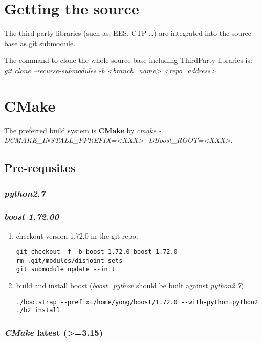 \documentclass[11pt]{article}
\author{Yong}
\date{\today}
\title{}
\begin{document}
\tableofcontents

\section{Getting the source}
\label{sec:org9200199}
The third party libraries (such as, EES, CTP \ldots{}) are integrated into the source base
as git submodule.

The command to clone the whole source base including ThirdParty libraries is:
\emph{git clone --recurse-submodules -b <branch\_name> <repo\_address>}

\section{CMake}
\label{sec:orge7b3446}
The preferred build system is \textbf{CMake} by \emph{cmake -DCMAKE\_INSTALL\_PPREFIX=<XXX> -DBoost\_ROOT=<XXX>}. 
\subsection{Pre-requsites}
\label{sec:org0c4a7f6}
\subsubsection{\emph{python2.7}}
\label{sec:org5d14f57}
\subsubsection{\emph{boost 1.72.00}}
\label{sec:org0d8594e}

\begin{enumerate}
\item checkout version 1.72.0 in the git repo:
\begin{verbatim}
git checkout -f -b boost-1.72.0 boost-1.72.0
rm .git/modules/disjoint_sets
git submodule update --init
\end{verbatim}
\item build and install boost (\emph{boost\_python} should be built against \emph{python2.7})
\begin{verbatim}
./bootstrap --prefix=/home/yong/boost/1.72.0 --with-python=python2
./b2 install
\end{verbatim}
\end{enumerate}

\subsubsection{\emph{CMake} latest (>=3.15)}
\label{sec:org48a2038}
\end{document}
